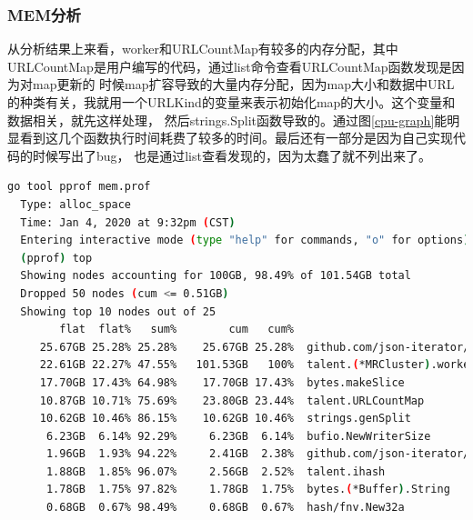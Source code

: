 \documentclass[UTF8]{ctexart}
\begin{document}
\subsubsection{MEM分析}

从分析结果上来看，worker和URLCountMap有较多的内存分配，其中URLCountMap是用户编写的代码，通过list命令查看URLCountMap函数发现是因为对map更新的
时候map扩容导致的大量内存分配，因为map大小和数据中URL的种类有关，我就用一个URLKind的变量来表示初始化map的大小。这个变量和数据相关，就先这样处理，
然后strings.Split函数导致的。通过图\ref{cpu-graph}能明显看到这几个函数执行时间耗费了较多的时间。最后还有一部分是因为自己实现代码的时候写出了bug，
也是通过list查看发现的，因为太蠢了就不列出来了。

\begin{lstlisting}[language=bash]
  go tool pprof mem.prof
  Type: alloc_space
  Time: Jan 4, 2020 at 9:32pm (CST)
  Entering interactive mode (type "help" for commands, "o" for options)
  (pprof) top
  Showing nodes accounting for 100GB, 98.49% of 101.54GB total
  Dropped 50 nodes (cum <= 0.51GB)
  Showing top 10 nodes out of 25
        flat  flat%   sum%        cum   cum%
     25.67GB 25.28% 25.28%    25.67GB 25.28%  github.com/json-iterator/go.NewStream
     22.61GB 22.27% 47.55%   101.53GB   100%  talent.(*MRCluster).worker
     17.70GB 17.43% 64.98%    17.70GB 17.43%  bytes.makeSlice
     10.87GB 10.71% 75.69%    23.80GB 23.44%  talent.URLCountMap
     10.62GB 10.46% 86.15%    10.62GB 10.46%  strings.genSplit
      6.23GB  6.14% 92.29%     6.23GB  6.14%  bufio.NewWriterSize
      1.96GB  1.93% 94.22%     2.41GB  2.38%  github.com/json-iterator/go.(*Iterator).ReadString
      1.88GB  1.85% 96.07%     2.56GB  2.52%  talent.ihash
      1.78GB  1.75% 97.82%     1.78GB  1.75%  bytes.(*Buffer).String
      0.68GB  0.67% 98.49%     0.68GB  0.67%  hash/fnv.New32a
\end{lstlisting}
\end{document}
